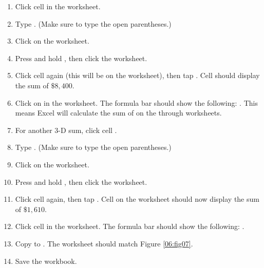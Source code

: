 \begin{enumbox}
	\begin{enumerate}
		\item Click cell  in the  worksheet.
		\item Type . (Make sure to type the open parentheses.)
		\item Click on the  worksheet.
		\item Press and hold , then click the  worksheet.
		\item Click cell  again (this will be on the  worksheet), then tap . Cell  should display the sum of $ \$8,400 $.
		\item Click on  in the  worksheet. The formula bar should show the following: . This means Excel will calculate the sum of  on the  through  worksheets.
		\item For another $ 3 $-D sum, click cell .
		\item Type . (Make sure to type the open parentheses.)
		\item Click on the  worksheet.
		\item Press and hold , then click the  worksheet.
		\item Click cell  again, then tap . Cell  on the  worksheet should now display the sum of $ \$1,610 $.
		\item Click cell  in the  worksheet. The formula bar should show the following: .
		\item Copy  to . The  worksheet should match Figure \ref{06:fig07}.
		\item Save the  workbook.
	\end{enumerate}
\end{enumbox}

